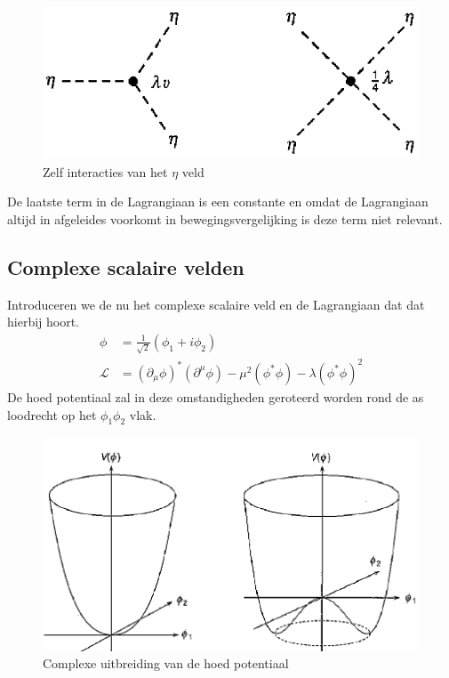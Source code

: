 \documentclass[../main.tex]{subfiles}
\begin{document}
\begin{figure}[h]
    \centering
    \includegraphics[width=0.4\linewidth]{higgs_boson/zelf_int_eta.png}
    \caption{Zelf interacties van het $\eta$ veld}%
    \label{fig:higgs_boson/zelf_int_eta}
\end{figure}

De laatste term in de Lagrangiaan is een constante en omdat de Lagrangiaan altijd in afgeleides voorkomt in bewegingsvergelijking is deze term niet relevant.

\subsection{Complexe scalaire velden}%
\label{sub:complexe_scalaire_velden}

Introduceren we de nu het complexe scalaire veld en de Lagrangiaan dat dat hierbij hoort.
\begin{equation}
    \begin{aligned}
        \label{eq:complex_scalair_veld}
        \phi &= \frac{1}{\sqrt{2}} (\phi_1 + i\phi_2)\\
        \mathcal{L} &= (\partial_\mu \phi)^*(\partial^\mu\phi) - \mu^2(\phi^*\phi) - \lambda(\phi^*\phi)^2
    \end{aligned}
\end{equation}
De hoed potentiaal zal in deze omstandigheden geroteerd worden rond de as loodrecht op het $\phi_1\phi_2$ vlak.

\begin{figure}[h]
    \centering
    \includegraphics[width=0.6\linewidth]{higgs_boson/hoed_pot_comp.png}
    \caption{Complexe uitbreiding van de hoed potentiaal}%
    \label{fig:higgs_boson/hoed_pot_comp}
\end{figure}
\end{document}
